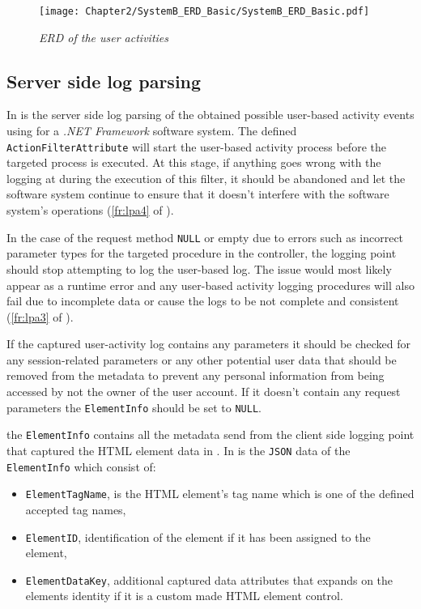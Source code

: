 \begin{figure}[!htb] %
	\centering %
	\texttt{[image: Chapter2/SystemB\_ERD\_Basic/SystemB\_ERD\_Basic.pdf]}
	\caption[ERD of user activities]
	{\textit{ERD of the user activities}}\label{fig:ch2_erdOfEventLogs}
\end{figure}

\subsection{Server side log parsing}
In  is the server side log parsing of the obtained possible user-based activity events using for a \emph{.NET Framework} software system. The defined \texttt{ActionFilterAttribute} will start the user-based activity process before the targeted process is executed. At this stage, if anything goes wrong with the logging at during the execution of this filter, it should be abandoned and let the software system continue to ensure that it doesn't interfere with the software system's operations (\ref{fr:lpa4} of ).\par In the case of the request method \texttt{NULL} or empty due to errors such as incorrect parameter types for the targeted procedure in the controller, the logging point should stop attempting to log the user-based log. The issue would most likely appear as a runtime error and any user-based activity logging procedures will also fail due to incomplete data or cause the logs to be not complete and consistent (\ref{fr:lpa3} of ).\par If the captured user-activity log contains any parameters it should be checked for any session-related parameters or any other potential user data that should be removed from the metadata to prevent any personal information from being accessed by not the owner of the user account. If it doesn't contain any request parameters the \texttt{ElementInfo} should be set to \texttt{NULL}.\par the \texttt{ElementInfo} contains all the metadata send from the client side logging point that captured the HTML element data in . In  is the \texttt{JSON} data of the \texttt{ElementInfo} which consist of:

\begin{itemize}
	\item \texttt{ElementTagName}, is the HTML element's tag name which is one of the defined accepted tag names,
	\item \texttt{ElementID}, identification of the element if it has been assigned to the element,
	\item \texttt{ElementDataKey}, additional captured data attributes that expands on the elements identity if it is a custom made HTML element control.
\end{itemize}

